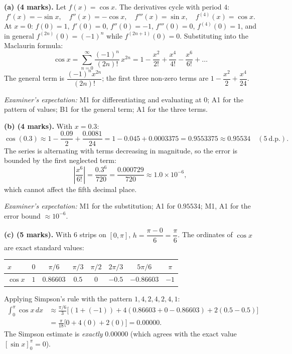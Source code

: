 \documentclass[11pt]{article}
\begin{document}
\begin{corrige}
\textbf{(a) (4 marks).} Let $f(x) = \cos x$. The derivatives cycle with period $4$:
\[ f'(x) = -\sin x,\quad f''(x) = -\cos x,\quad f'''(x) = \sin x,\quad f^{(4)}(x) = \cos x. \]
At $x = 0$: $f(0) = 1$, $f'(0) = 0$, $f''(0) = -1$, $f'''(0) = 0$, $f^{(4)}(0) = 1$, and in general $f^{(2n)}(0) = (-1)^n$ while $f^{(2n+1)}(0) = 0$. Substituting into the Maclaurin formula:
\[ \cos x = \sum_{n=0}^{\infty} \frac{(-1)^n}{(2n)!}\,x^{2n} = 1 - \frac{x^2}{2!} + \frac{x^4}{4!} - \frac{x^6}{6!} + \dots \]
The general term is $\dfrac{(-1)^n x^{2n}}{(2n)!}$; the first three non-zero terms are $1 - \dfrac{x^2}{2} + \dfrac{x^4}{24}$.

\emph{Examiner's expectation:} M1 for differentiating and evaluating at $0$; A1 for the pattern of values; B1 for the general term; A1 for the three terms.

\textbf{(b) (4 marks).} With $x = 0.3$:
\[ \cos(0.3) \approx 1 - \frac{0.09}{2} + \frac{0.0081}{24} = 1 - 0.045 + 0.0003375 = 0.9553375 \approx 0.95534 \quad (5\ \text{d.p.}). \]
The series is alternating with terms decreasing in magnitude, so the error is bounded by the first neglected term:
\[ \left|\frac{x^6}{6!}\right| = \frac{0.3^6}{720} = \frac{0.000729}{720} \approx 1.0 \times 10^{-6}, \]
which cannot affect the fifth decimal place.

\emph{Examiner's expectation:} M1 for the substitution; A1 for $0.95534$; M1, A1 for the error bound $\approx 10^{-6}$.

\textbf{(c) (5 marks).} With 6 strips on $[0,\pi]$, $h = \dfrac{\pi - 0}{6} = \dfrac{\pi}{6}$. The ordinates of $\cos x$ are exact standard values:

\begin{center}
\begin{tabular}{|l|c|c|c|c|c|c|c|}
\hline
\rowcolor{popblueL} $x$ & $0$ & $\pi/6$ & $\pi/3$ & $\pi/2$ & $2\pi/3$ & $5\pi/6$ & $\pi$ \\
\hline
$\cos x$ & $1$ & $0.86603$ & $0.5$ & $0$ & $-0.5$ & $-0.86603$ & $-1$ \\
\hline
\end{tabular}
\end{center}

Applying Simpson's rule with the pattern $1, 4, 2, 4, 2, 4, 1$:
\begin{align*}
\int_0^{\pi}\cos x\,dx &\approx \frac{\pi/6}{3}\Big[(1 + (-1)) + 4(0.86603 + 0 - 0.86603) + 2(0.5 - 0.5)\Big] \\
&= \frac{\pi}{18}\big[0 + 4(0) + 2(0)\big] = 0.00000.
\end{align*}
The Simpson estimate is \emph{exactly} $0.00000$ (which agrees with the exact value $[\sin x]_0^{\pi} = 0$).


\end{corrige}
\end{document}
